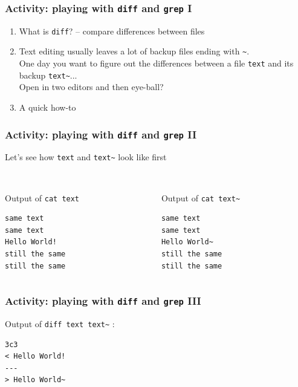 \begin{frame}
\frametitle{Activity: playing with \texttt{diff} and \texttt{grep} I}
\begin{enumerate}
\item What is \texttt{diff}? -- compare differences between files
\item Text editing usually leaves a lot of backup files ending with \texttt{\~}.\\  
One day you want to figure out the differences between a file \texttt{text} and its backup \texttt{text\~}...\\  
Open in two editors and then eye-ball?
\item A quick how-to
\end{enumerate}
\end{frame}


\begin{frame}[fragile]
\frametitle{Activity: playing with \texttt{diff} and \texttt{grep} II}
Let's see how \texttt{text} and \texttt{text\~} look like first

\begin{columns}
\begin{column}{0.5\textwidth}
\\ Output of \texttt{cat text}

\begin{verbatim}
same text
same text
Hello World!
still the same
still the same
\end{verbatim}
\end{column}

\begin{column}{0.5\textwidth}
\\ Output of \texttt{cat text\~}
\begin{verbatim}
same text
same text
Hello World~
still the same
still the same
\end{verbatim}
\end{column}
\end{columns}
\end{frame}


\begin{frame}[fragile]
\frametitle{Activity: playing with \texttt{diff} and \texttt{grep} III}
Output of \texttt{diff text text\~} :
\begin{verbatim}
3c3
< Hello World!
---
> Hello World~
\end{verbatim}
\end{frame}



